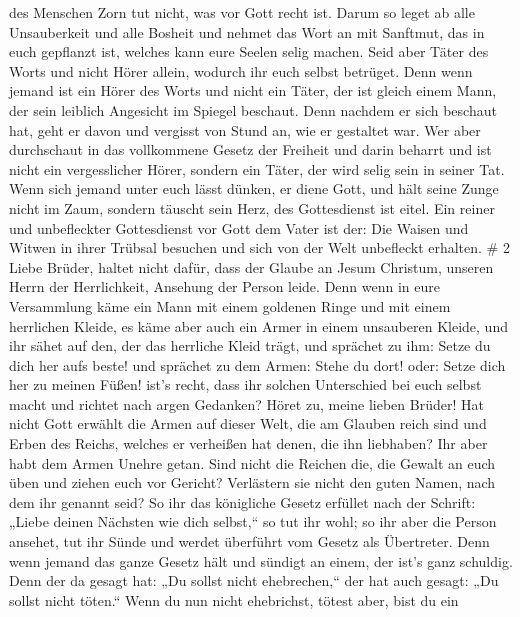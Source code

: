 des Menschen Zorn tut nicht, was vor Gott recht ist.  Darum
so leget ab alle Unsauberkeit und alle Bosheit und nehmet das Wort an
mit Sanftmut, das in euch gepflanzt ist, welches kann eure Seelen selig
machen.  Seid aber Täter des Worts und nicht Hörer allein,
wodurch ihr euch selbst betrüget.  Denn wenn jemand ist ein
Hörer des Worts und nicht ein Täter, der ist gleich einem Mann, der sein
leiblich Angesicht im Spiegel beschaut.  Denn nachdem er
sich beschaut hat, geht er davon und vergisst von Stund an, wie er
gestaltet war.  Wer aber durchschaut in das vollkommene
Gesetz der Freiheit und darin beharrt und ist nicht ein vergesslicher
Hörer, sondern ein Täter, der wird selig sein in seiner Tat.
 Wenn sich jemand unter euch lässt dünken, er diene Gott,
und hält seine Zunge nicht im Zaum, sondern täuscht sein Herz, des
Gottesdienst ist eitel.  Ein reiner und unbefleckter
Gottesdienst vor Gott dem Vater ist der: Die Waisen und Witwen in ihrer
Trübsal besuchen und sich von der Welt unbefleckt erhalten. \# 2
 Liebe Brüder, haltet nicht dafür, dass der Glaube an Jesum
Christum, unseren Herrn der Herrlichkeit, Ansehung der Person leide.
 Denn wenn in eure Versammlung käme ein Mann mit einem
goldenen Ringe und mit einem herrlichen Kleide, es käme aber auch ein
Armer in einem unsauberen Kleide,  und ihr sähet auf den,
der das herrliche Kleid trägt, und sprächet zu ihm: Setze du dich her
aufs beste! und sprächet zu dem Armen: Stehe du dort! oder: Setze dich
her zu meinen Füßen!  ist's recht, dass ihr solchen
Unterschied bei euch selbst macht und richtet nach argen Gedanken?
 Höret zu, meine lieben Brüder! Hat nicht Gott erwählt die
Armen auf dieser Welt, die am Glauben reich sind und Erben des Reichs,
welches er verheißen hat denen, die ihn liebhaben?  Ihr aber
habt dem Armen Unehre getan. Sind nicht die Reichen die, die Gewalt an
euch üben und ziehen euch vor Gericht?  Verlästern sie nicht
den guten Namen, nach dem ihr genannt seid?  So ihr das
königliche Gesetz erfüllet nach der Schrift: „Liebe deinen Nächsten wie
dich selbst,`` so tut ihr wohl;  so ihr aber die Person
ansehet, tut ihr Sünde und werdet überführt vom Gesetz als Übertreter.
 Denn wenn jemand das ganze Gesetz hält und sündigt an
einem, der ist's ganz schuldig.  Denn der da gesagt hat:
„Du sollst nicht ehebrechen,`` der hat auch gesagt: „Du sollst nicht
töten.`` Wenn du nun nicht ehebrichst, tötest aber, bist du ein
